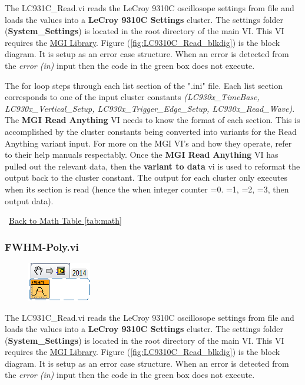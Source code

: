 \documentclass[11pt,a4paper,oldfontcommands]{memoir}
\begin{document}
The LC931C\_Read.vi reads the LeCroy 9310C oscillosope settings from file and loads the values into a \textbf{LeCroy 9310C Settings} cluster. The settings folder (\textbf{System\_Settings}) is located in the root directory of the main VI. This VI requires the \href{http://sine.ni.com/nips/cds/view/p/lang/en/nid/209753}{MGI Library}. Figure (\ref{fig:LC9310C_Read_blkdig}) is the block diagram.  It is setup as an error case structure. When an error is detected from the \textit{error (in)} input then the code in the green box does not execute.

The for loop steps through each list section of the ".ini" file. Each list section corresponds to one of the input cluster constants \textit{(LC930x\_TimeBase, LC930x\_Vertical\_Setup, LC930x\_Trigger\_Edge\_Setup, LC930x\_Read\_Wave)}. The \textbf{MGI Read Anything} VI needs to know the format of each section. This is accomplished by the cluster constants being converted into variants for the Read Anything variant input.  For more on the MGI VI's and how they operate, refer to their help manuals respectably. Once the \textbf{MGI Read Anything} VI has pulled out the relevant data, then the \textbf{variant to data} vi is used to reformat the output back to the cluster constant. The output for each cluster only executes when its section is read (hence the when integer counter =0. =1, =2, =3, then output data).

\noindent\hrulefill\, \hyperref[tab:math]{Back to Math Table \ref{tab:math}}

\subsubsection{FWHM-Poly.vi} \label{FWHM-Poly}
\noindent\hrulefill

\begin{figure}[h]
	\includegraphics[scale=0.625]{FWHM-Poly_main_01}
	\label{fig:FWHM-Poly_main_01}
\end{figure}

The LC931C\_Read.vi reads the LeCroy 9310C oscillosope settings from file and loads the values into a \textbf{LeCroy 9310C Settings} cluster. The settings folder (\textbf{System\_Settings}) is located in the root directory of the main VI. This VI requires the \href{http://sine.ni.com/nips/cds/view/p/lang/en/nid/209753}{MGI Library}. Figure (\ref{fig:LC9310C_Read_blkdig}) is the block diagram.  It is setup as an error case structure. When an error is detected from the \textit{error (in)} input then the code in the green box does not execute.
\end{document}
